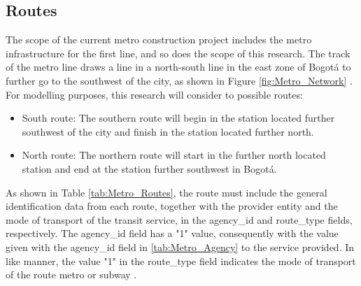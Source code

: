 \documentclass[12pt, a4paper]{report}
\begin{document}
\subsection{Routes}

The scope of the current metro construction project includes the metro infrastructure for the first line, and so does the scope of this research. The track of the metro line draws a line in a north-south line in the east zone of Bogotá to further go to the southwest of the city, as shown in Figure \ref{fig:Metro_Network} . For modelling purposes, this research will consider to possible routes:

\begin{itemize}
\item South route: The southern route will begin in the station located further southwest of the city and finish in the station located further north.
\item North route: The northern route will start in the further north located station and end at the station further southwest in Bogotá.
\end{itemize}

\begin{table}[ht]
\centering
\renewcommand{\arraystretch}{1.5}
\caption{Metro routes table.}
\label{tab:Metro_Routes}
\end{table}

As shown in Table \ref{tab:Metro_Routes}, the route must include the general identification data from each route, together with the provider entity and the mode of transport of the transit service, in the agency\_id and route\_type fields, respectively. The agency\_id field has a "1" value, consequently with the value given with the agency\_id field in \ref{tab:Metro_Agency} to the service provided. In like manner, the value "1" in the route\_type field indicates the mode of transport of the route metro or subway \citep{mobiltydataGeneralTransitFeed2023}. 
\end{document}
